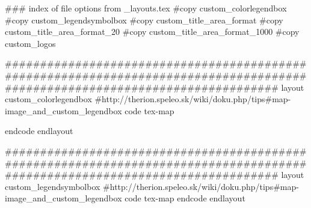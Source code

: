 ### index of file options from _layouts.tex
  #copy custom_colorlegendbox
  #copy custom_legendsymbolbox
  #copy custom_title_area_format
  #copy custom_title_area_format_20
  #copy custom_title_area_format_1000
  #copy custom_logos

#############################################################################################################################
layout custom_colorlegendbox
  #http://therion.speleo.sk/wiki/doku.php/tips#map-image_and_custom_legendbox
  code tex-map
        \def\colorlegendbox#1{%
           \setbox\xxx=\hbox to 36bp{\PL{q #1 0 0 36 24 re f Q}\hfil}%
           \ht\xxx=25bp
           \dp\xxx=0bp
	   \wd\xxx=36bp
           \immediate\pdfxform resources{/ExtGState \the\resid\space 0 R \colorres}\xxx
        }


	\def\colorlegendboxDuff#1#2{%
	  \setbox\tmpboxa=\hbox to 36bp{\PL{q #1 0 0 36 24 re f Q}\hfil}%

	  \setbox\tmpboxb=\hbox{\the\legendtextsize(}%
	  \legendsymbolwd=\wd\tmpboxa
	  \legendsymbolht=\ht\tmpboxa
	  \advance\legendsymbolht by -\ht\tmpboxb
	  \advance\legendsymbolht by -\ht\tmpboxb %
	  \advance\legendsymbolht by -20pt        %
	  \advance\legendsymbolht by -1dd
	  \tmpdimen=\hsize
	    \advance\tmpdimen by 10pt 
	    \divide\tmpdimen by\legendcolumns 
	    \advance\tmpdimen by-10pt
	  \hbox to \tmpdimen{%
	     \box\tmpboxa\kern10pt\raise\legendsymbolht\vtop{%
	       \advance\tmpdimen by -\legendsymbolwd
	       \advance\tmpdimen by -10pt
	       \hsize=\tmpdimen\rightskip=0pt plus \tmpdimen minus 0pt\relax\the\legendtextsize #2\vskip1dd}\hss}%
	}

  endcode
endlayout

#############################################################################################################################
layout custom_legendsymbolbox
  #http://therion.speleo.sk/wiki/doku.php/tips#map-image_and_custom_legendbox
  code tex-map
	\def\legendsymbolbox#1#2{%
	  \setbox\tmpboxa=\hbox{\pdfrefxform#1}%
	  \setbox\tmpboxb=\hbox{\the\legendtextsize(}%
	  \legendsymbolwd=\wd\tmpboxa
	  \legendsymbolht=\ht\tmpboxa
	  \advance\legendsymbolht by -\ht\tmpboxb
	  \advance\legendsymbolht by -\ht\tmpboxb %
	  \advance\legendsymbolht by -20pt        %
	  \advance\legendsymbolht by -1dd
	  \tmpdimen=\hsize
	    \advance\tmpdimen by 10pt 
	    \divide\tmpdimen by\legendcolumns 
	    \advance\tmpdimen by-10pt
	  \hbox to \tmpdimen{%
	     \box\tmpboxa\kern10pt\raise\legendsymbolht\vtop{%
	       \advance\tmpdimen by -\legendsymbolwd
	       \advance\tmpdimen by -10pt
	       \hsize=\tmpdimen\rightskip=0pt plus \tmpdimen minus 0pt\relax\the\legendtextsize #2\vskip1dd}\hss}%
	}
  endcode
endlayout

